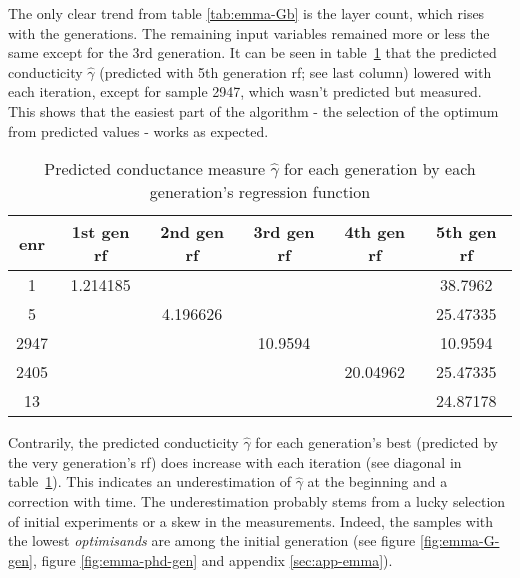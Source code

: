 The only clear trend from table \ref{tab:emma-Gb} is the layer count, which rises with the generations. 
The remaining input variables remained more or less the same except for the 3rd generation. 
%
It can be seen in table~\ref{tab:emma-pred-G} 
that the predicted conducticity $\hat{\gamma}$ 
(predicted with 5th generation \gls{rf}; see last column) lowered with each iteration, 
except for sample 2947, which wasn't predicted but measured. 
This shows that the easiest part of the algorithm - the selection of the optimum 
from predicted values - works as expected. 
\begin{table}
	\centering
    \caption{Predicted conductance measure $\hat{\gamma}$ for each generation by each generation's regression function}  
    \label{tab:emma-pred-G}
    \begin{tabular}{cccccc}
        \hline\hline
    enr &1st gen \gls{rf}   &2nd gen \gls{rf} &3rd gen \gls{rf}    &4th gen \gls{rf}   &5th gen \gls{rf}\\
        \hline
    1       &1.214185    &       &       &       &38.7962       \\
    5       &       &4.196626       &       &       &25.47335       \\
    2947    &       &       &10.9594    &       &10.9594       \\
    2405    &       &       &       &20.04962   &25.47335       \\
    13      &       &       &       &       &24.87178   \\
        \hline\hline
    \end{tabular}
\end{table}
%
Contrarily, the predicted conducticity $\hat{\gamma}$ for each generation's best 
(predicted by the very generation's \gls{rf}) does increase with each iteration 
(see diagonal in table~\ref{tab:emma-pred-G}). 
This indicates an underestimation of $\hat\gamma$ at the beginning and a correction with time. 
The underestimation probably stems from a lucky selection of initial experiments or a skew in the measurements. 
\linebreak[4]
Indeed, the samples with the lowest \textit{optimisands} are among the initial generation (see figure \ref{fig:emma-G-gen}, figure \ref{fig:emma-phd-gen} and appendix \ref{sec:app-emma}).

